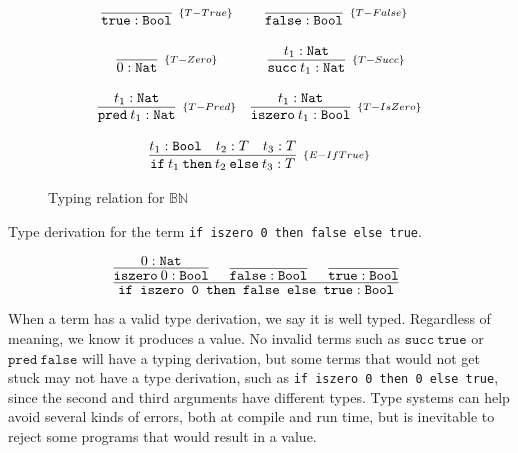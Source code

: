 \begin{figure*}[!h]
    \[
        \begin{array}{cc}
            \infer[_{\{T-True\}}]{\texttt{true} : \texttt{Bool}}{}
            &
            \infer[_{\{T-False\}}]{\texttt{false} : \texttt{Bool}}{}
            \\ \\
            \infer[_{\{T-Zero\}}]{0 : \texttt{Nat}}{}
            &
            \infer[_{\{T-Succ\}}]{\texttt{succ}\:t_1 : \texttt{Nat}}{t_1 : \texttt{Nat}}
            \\ \\
            \infer[_{\{T-Pred\}}]{\texttt{pred}\:t_1 : \texttt{Nat}}{t_1 : \texttt{Nat}}
            &
            \infer[_{\{T-IsZero\}}]{\texttt{iszero}\:t_1 : \texttt{Bool}}{t_1 : \texttt{Nat}}
            \\ \\
            \multicolumn{2}{c}{
                \infer[_{\{E-IfTrue\}}]{
                    \texttt{if}\:t_1\:\texttt{then}\:t_2\:\texttt{else}\:t_3 : T
                }{
                    t_1 : \texttt{Bool} & t_2 : T & t_3 : T
                }
            }
        \end{array}
    \]
    \centering
    \caption{Typing relation for \(\mathbb{B}\mathbb{N}\)}
    \label{fig:bn-typing-relation}
\end{figure*}

\begin{example}
    Type derivation for the term \texttt{if iszero 0 then false else true}.

    \[
        \infer[]{
            \texttt{if iszero 0 then false else true} : \texttt{Bool}
        }{
            \infer[]{
                \texttt{iszero}\:0 : \texttt{Bool}
            }{
                0 : \texttt{Nat}
            }
            &
            \infer[]{\texttt{false} : \texttt{Bool}}{}
            &
            \infer[]{\texttt{true} : \texttt{Bool}}{}
        }
    \]
\end{example}

When a term has a valid type derivation, we say it is well typed. Regardless of
meaning, we know it produces a value. No invalid terms such as \(\texttt{succ}\:
\texttt{true}\) or \(\texttt{pred}\:\texttt{false}\) will have a typing derivation,
but some terms that would not get stuck may not have a type derivation, such as
\texttt{if iszero 0 then 0 else true}, since the second and third arguments have 
different types. Type systems can help avoid several kinds of errors, both at 
compile and run time, but is inevitable to reject some programs that would result 
in a value.

